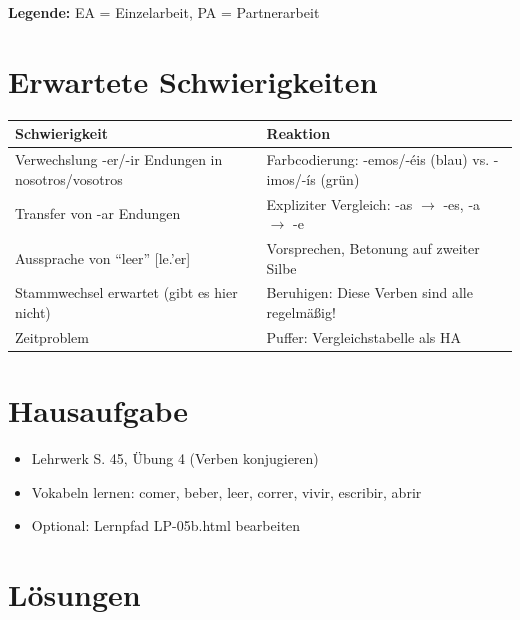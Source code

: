 \documentclass[11pt,a4paper]{article}
\begin{document}
\textbf{Legende:} EA = Einzelarbeit, PA = Partnerarbeit

\section{Erwartete Schwierigkeiten}

\begin{tabular}{|p{4.5cm}|p{8cm}|}
\hline
\textbf{Schwierigkeit} & \textbf{Reaktion} \\
\hline
Verwechslung -er/-ir Endungen in nosotros/vosotros & Farbcodierung: -emos/-éis (blau) vs. -imos/-ís (grün) \\
\hline
Transfer von -ar Endungen & Expliziter Vergleich: -as $\rightarrow$ -es, -a $\rightarrow$ -e \\
\hline
Aussprache von ``leer'' [le.'er] & Vorsprechen, Betonung auf zweiter Silbe \\
\hline
Stammwechsel erwartet (gibt es hier nicht) & Beruhigen: Diese Verben sind alle regelmäßig! \\
\hline
Zeitproblem & Puffer: Vergleichstabelle als HA \\
\hline
\end{tabular}

\section{Hausaufgabe}

\begin{itemize}
    \item Lehrwerk S. 45, Übung 4 (Verben konjugieren)
    \item Vokabeln lernen: comer, beber, leer, correr, vivir, escribir, abrir
    \item Optional: Lernpfad LP-05b.html bearbeiten
\end{itemize}

\section{Lösungen}
\end{document}
